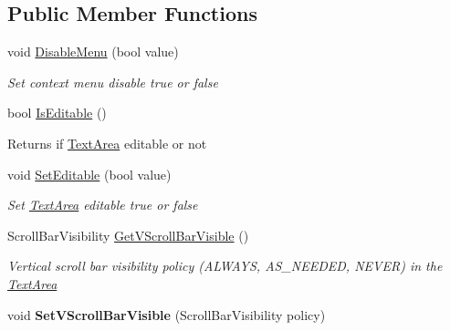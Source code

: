 \subsection*{Public Member Functions}
\begin{DoxyCompactItemize}
\item 
void \mbox{\hyperlink{class_space_v_i_l_1_1_text_area_a7089fae13c670a2f47a6f188e5f5f1ee}{Disable\+Menu}} (bool value)
\begin{DoxyCompactList}\small\item\em Set context menu disable true or false \end{DoxyCompactList}\item 
\mbox{\label{class_space_v_i_l_1_1_text_area_ab0b47e2b62afb0441e91b422a071fa74}} 
bool \mbox{\hyperlink{class_space_v_i_l_1_1_text_area_ab0b47e2b62afb0441e91b422a071fa74}{Is\+Editable}} ()
\begin{DoxyCompactList}\small\item\em \begin{DoxyReturn}{Returns}
if \mbox{\hyperlink{class_space_v_i_l_1_1_text_area}{Text\+Area}} editable or not 
\end{DoxyReturn}
\end{DoxyCompactList}\item 
void \mbox{\hyperlink{class_space_v_i_l_1_1_text_area_aace48f2c2e10b98336dc0a06d85e3b9f}{Set\+Editable}} (bool value)
\begin{DoxyCompactList}\small\item\em Set \mbox{\hyperlink{class_space_v_i_l_1_1_text_area}{Text\+Area}} editable true or false \end{DoxyCompactList}\item 
Scroll\+Bar\+Visibility \mbox{\hyperlink{class_space_v_i_l_1_1_text_area_a431947482c1e18238219b5e14801b99f}{Get\+V\+Scroll\+Bar\+Visible}} ()
\begin{DoxyCompactList}\small\item\em Vertical scroll bar visibility policy (A\+L\+W\+A\+YS, A\+S\+\_\+\+N\+E\+E\+D\+ED, N\+E\+V\+ER) in the \mbox{\hyperlink{class_space_v_i_l_1_1_text_area}{Text\+Area}} \end{DoxyCompactList}\item 
\mbox{\label{class_space_v_i_l_1_1_text_area_a34a8bc3d00a4e471af20b8a201e8bc0f}} 
void {\bfseries Set\+V\+Scroll\+Bar\+Visible} (Scroll\+Bar\+Visibility policy)

\end{DoxyCompactItemize}
